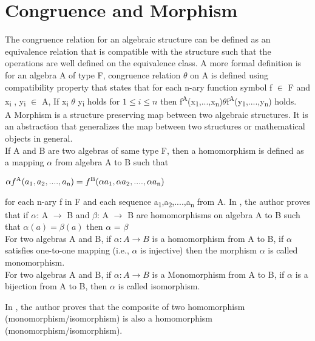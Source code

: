\section{Congruence and Morphism}
The congruence relation for an algebraic structure can be defined as an equivalence relation that is compatible with the structure such that the operations are well defined on the equivalence class. A more formal definition is for an algebra A of type F, congruence relation \(\theta\) on A is defined using compatibility property that states that for each n-ary function symbol f \(\in\) F and x\textsubscript{i} , y\textsubscript{i} \(\in\) A, If x\textsubscript{i} \(\theta\) y\textsubscript{i}  holds for \(1\leq i \leq n\) then f\textsuperscript{A}(x\textsubscript{1},...,x\textsubscript{n})\(\theta\)f\textsuperscript{A}(y\textsubscript{1},....,y\textsubscript{n}) holds\cite{sankappanavar1981course}.\\

A Morphism is a structure preserving map between two algebraic structures. It is an abstraction that generalizes the map between two structures or mathematical objects in general. \\
If A and B are two algebras of same type F, then a homomorphism is defined as a mapping \(\alpha\) from algebra A to B such that
\begin{center}
\(\alpha f\textsuperscript{A}(a\textsubscript{1},a\textsubscript{2},....,a\textsubscript{n}) = f\textsuperscript{B}(\alpha a\textsubscript{1},\alpha a\textsubscript{2},....,\alpha a\textsubscript{n})\)\\
\end{center}
for each n-ary f in F and each sequence a\textsubscript{1},a\textsubscript{2},....,a\textsubscript{n} from A. In \cite{sankappanavar1981course}, the author proves that if \(\alpha\): A \(\rightarrow\) B and \(\beta\): A \(\rightarrow\) B are homomorphisms on algebra A to B such that \(\alpha (a) = \beta (a) \) then \(\alpha\) = \(\beta\)
\\

For two algebras A and B, if \(\alpha : A \rightarrow B \)  is a homomorphism from A to B, if \(\alpha\) satisfies one-to-one mapping (i.e., \(\alpha\) is injective) then the morphism \(\alpha\) is called monomorphism. \\

For two algebras A and B, if \(\alpha : A \rightarrow B \)  is a Monomorphism from A to B, if \(\alpha\) is a bijection from A to B, then \(\alpha\) is called isomorphism.

In \cite{sankappanavar1981course}, the author proves that the composite of two homomorphism (monomorphism/isomorphism) is also a homomorphism (monomorphism/isomorphism).
